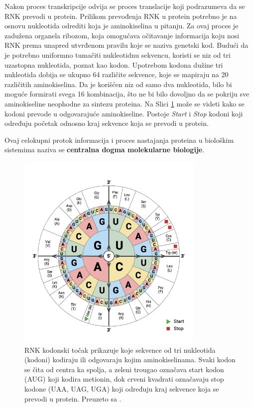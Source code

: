 \documentclass[12pt,oneside]{memoir}
\begin{document}
Nakon proces transkripcije odvija se proces translacije koji podrazumeva da se RNK prevodi u protein. Prilikom prevođenja RNK u protein potrebno je na osnovu nukleotida odrediti koja je aminokiselina u pitanju. Za ovaj proces je zadužena organela ribozom, koja omogućava očitavanje informacija koju nosi RNK prema unapred utvrđenom pravilu koje se naziva genetski kod. Budući da je potrebno uniformno tumačiti nukleotidnu sekvencu, koristi se niz od tri uzastopna nukleotida, poznat kao kodon. Upotrebom kodona dužine tri nukleotida dobija se ukupno 64 različite sekvence, koje se mapiraju na 20 različitih aminokiselina. Da je korišćen niz od samo dva nukleotida, bilo bi moguće formirati svega 16 kombinacija, što ne bi bilo dovoljno da se pokriju sve aminokiseline neophodne za sintezu proteina. Na Slici \ref{fig:codon-wheel} može se videti kako se kodoni prevode u odgovarajuće aminokiseline. Postoje \emph{Start} i \emph{Stop} kodoni koji određuju početak odnosno kraj sekvence koja se prevodi u protein.

Ovaj celokupni protok informacija i proces nastajanja proteina u biološkim sistemima naziva se \textbf{centralna dogma molekularne biologije}.

\begin{figure}[H]
  \centering
  \includegraphics[width=0.8\textwidth]{images/RNA-Codon-Wheel.png}
  \caption{RNK kodonski točak prikazuje koje sekvence od tri nukleotida (kodoni) kodiraju ili odgovaraju kojim aminokiselinama. Svaki kodon se čita od centra ka spolja, a zeleni trougao označava start kodon (AUG) koji kodira metionin, dok crveni kvadrati označavaju stop kodone (UAA, UAG, UGA) koji određuju kraj sekvence koja se prevodi u protein. Preuzeto sa \cite{codon_chart}.}
  \label{fig:codon-wheel}
\end{figure}
\end{document}
